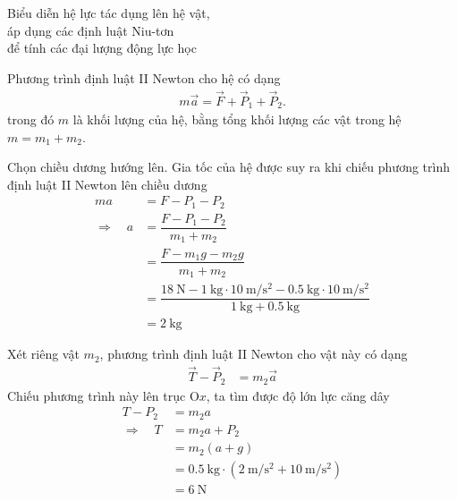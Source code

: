 \begin{dang}{Biểu diễn hệ lực tác dụng lên hệ vật, \\áp dụng các định luật Niu-tơn \\để tính các đại lượng động lực học}
{		Phương trình định luật II Newton cho hệ có dạng 
			\begin{align}\label{IINewton-m1m2}
				m\vec{a}=\vec{F}+\vec{P}_1+\vec{P}_2.
			\end{align} 
		trong đó $m$ là khối lượng của hệ, bằng tổng khối lượng các vật trong hệ $m=m_1+m_2$. 
		
		Chọn chiều dương hướng lên. Gia tốc của hệ được suy ra khi chiếu phương trình định luật II Newton lên chiều dương 
		\begin{align*}
			ma&=F-P_1-P_2\\
			\Rightarrow\quad a&=\dfrac{F-P_1-P_2}{m_1+m_2}\\
				&=\dfrac{F-m_1g-m_2g}{m_1+m_2}\\
				&=\dfrac{\SI{18}{\newton}-\SI{1}{\kilogram}\cdot\SI{10}{\meter/\second^2}-\SI{0.5}{\kilogram}\cdot\SI{10}{\meter/\second^{2}}}{\SI{1}{\kilogram}+\SI{0.5}{\kilogram}}\\
				&=\SI{2}{\kilogram}		
		\end{align*}
			
		Xét riêng vật $m_2$, phương trình định luật II Newton cho vật này có dạng 
			\begin{align}\label{dlIINewton-m2}
				\vec{T}-\vec{P}_2&=m_2\vec{a}
			\end{align} 
		Chiếu phương trình này lên trục O$x$, ta tìm được độ lớn lực căng dây 
			\begin{align*}
				T-P_2&=m_2a\\
				\Rightarrow\quad T&=m_2a+P_2\\
				&=m_2(a+g)\\
				&=\SI{0.5}{\kilogram}\cdot(\SI{2}{\meter/\second^{2}}+\SI{10}{\meter/\second^{2}})\\
				&=\SI{6}{\newton}
			\end{align*}
		
	}
\end{dang}
